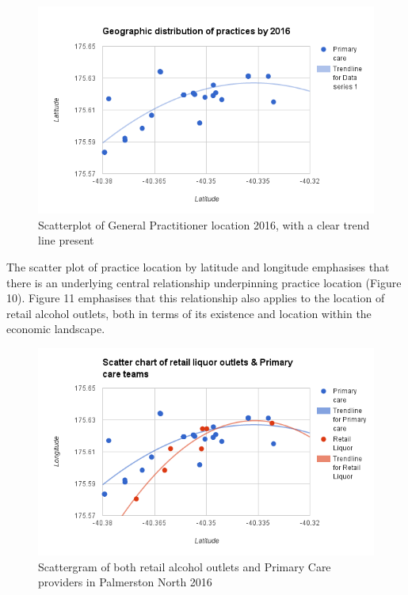 \documentclass[11pt,a4paper]{article}
\begin{document}
\begin{figure}[htp]
\centering
\includegraphics[scale=0.6]{Nash_GP_2016.png}
\caption{Scatterplot of General Practitioner location 2016, with a clear trend line present}
\label{Scatter plot of General Practitioner locations}
\end{figure}

The scatter plot of practice location by latitude and longitude emphasises that there is an underlying central relationship underpinning practice location (Figure 10). Figure 11 emphasises that this relationship also applies to the location of retail alcohol outlets, both in terms of its existence and location within the economic landscape.\\

\begin{figure}[htp]
\centering
\includegraphics[scale=0.6]{Nash_GP_retail.png}
\caption{ Scattergram of both retail alcohol outlets and Primary Care providers in Palmerston North 2016}
\label{Geographic distribution of practices by 2016, with retail outlets overlaid}
\end{figure}
\end{document}
